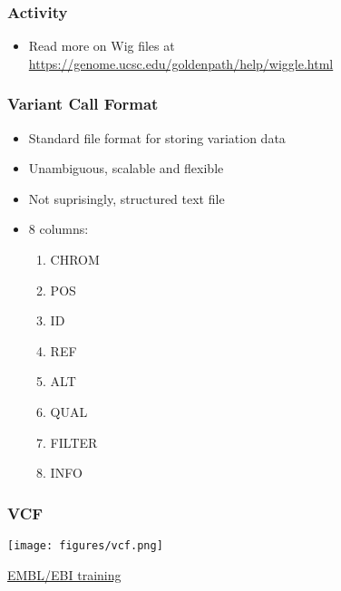 \documentclass{beamer}
\begin{document}
\begin{frame}
  \frametitle{Activity}
  \begin{itemize}
  \item Read more on Wig files at \url{https://genome.ucsc.edu/goldenpath/help/wiggle.html}
  \end{itemize}
\end{frame}









\begin{frame}
  \frametitle{Variant Call Format}
  \begin{itemize}
  \item Standard file format for storing variation data
  \item  Unambiguous, scalable and flexible
  \item Not suprisingly, structured text file
  \item 8 columns: 


    
    \begin{enumerate}
    \item  CHROM
     \item  POS
    \item   ID
    \item   REF
     \item  ALT
     \item  QUAL
     \item  FILTER
     \item  INFO
    \end{enumerate}


  \end{itemize}
\end{frame}


\begin{frame}
  \frametitle{VCF}
\texttt{[image: figures/vcf.png]}

\href{https://www.ebi.ac.uk/training/online/course/human-genetic-variation-introduction/exercise-title/want-know-how-we-did-it}{EMBL/EBI training}
\end{frame}
\end{document}
